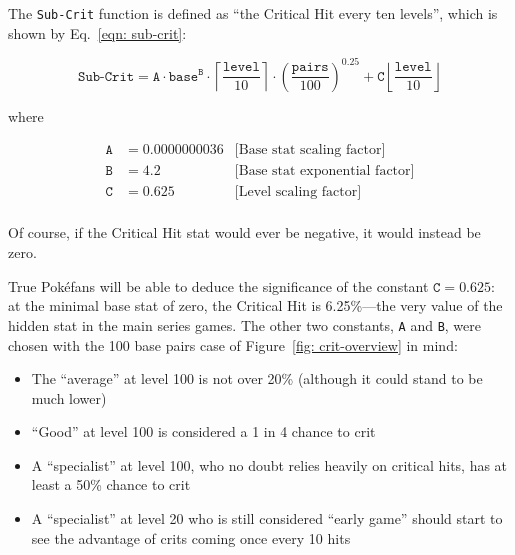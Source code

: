 \noindent The \texttt{Sub-Crit} function is defined as ``the Critical Hit every ten levels'', which is shown by Eq.~\eqref{eqn: sub-crit}:

\begin{equation}\label{eqn: sub-crit}
	\texttt{Sub-Crit} = 	\texttt{A} \cdot \texttt{base}^\texttt{B} 
						\cdot \left\lceil \frac{\texttt{level}}{10} \right\rceil
						\cdot \left(\frac{\texttt{pairs}}{100}\right)^{0.25}
						+ \texttt{C} \left\lfloor \frac{\texttt{level}}{10} \right\rfloor						
\end{equation}

\noindent where

\begin{align*}
	\texttt{A} &= 0.0000000036 	& \text{[Base stat scaling factor]}\\
	\texttt{B} &= 4.2			& \text{[Base stat exponential factor]}\\
	\texttt{C} &= 0.625			& \text{[Level scaling factor]}\\
\end{align*}

\noindent Of course, if the Critical Hit stat would ever be negative, it would instead be zero.

True Pok\'{e}fans will be able to deduce the significance of the constant $\texttt{C} = 0.625$: at the minimal base stat of zero, the Critical Hit is 6.25\%---the very value of the hidden stat in the main series games. The other two constants, \texttt{A} and \texttt{B}, were chosen with the 100 base pairs case of Figure~\ref{fig: crit-overview} in mind:
\begin{itemize}
	\item{The ``average'' at level 100 is not over 20\% (although it could stand to be much lower)}
	\item{``Good'' at level 100 is considered a 1 in 4 chance to crit}
	\item{A ``specialist'' at level 100, who no doubt relies heavily on critical hits, has at least a 50\% chance to crit}
	\item{A ``specialist'' at level 20 who is still considered ``early game'' should start to see the advantage of crits coming once every 10 hits}
\end{itemize}






\newpage

\printbibliography

